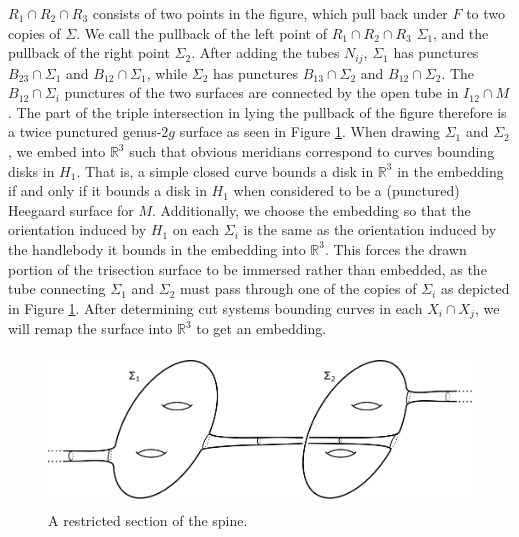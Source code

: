\documentclass[12pt]{amsart}
\newcommand{\R}{\mathbb{R}}
\theoremstyle{definition}
\theoremstyle{remark}
\begin{document}
$R_1 \cap R_2 \cap R_3$ consists of two points in the figure, which pull back under $F$ to two copies of $\Sigma$.  We call the pullback of the left point of $R_1 \cap R_2 \cap R_3$ $\Sigma_1$, and the pullback of the right point $\Sigma_2$.  After adding the tubes $N_{ij}$, $\Sigma_1$ has punctures $B_{23} \cap \Sigma_1$ and $B_{12} \cap \Sigma_1$, while $\Sigma_2$ has punctures $B_{13} \cap \Sigma_2$ and $B_{12} \cap \Sigma_2$.  The $B_{12} \cap \Sigma_i$ punctures of the two surfaces are connected by the open tube in $I_{12} \cap M$.   The part of the triple intersection in lying the pullback of the figure therefore is a twice punctured genus-$2g$ surface as seen in Figure \ref{fig_coresubsurface}.  When drawing $\Sigma_1$ and $\Sigma_2$, we embed into $\R^3$ such that obvious meridians correspond to curves bounding disks in $H_1$.  That is, a simple closed curve bounds a disk in $\R^3$ in the embedding if and only if it bounds a disk in $H_1$ when considered to be a (punctured) Heegaard surface for $M$.  Additionally, we choose the embedding so that the orientation induced by $H_1$ on each $\Sigma_i$ is the same as the orientation induced by the handlebody it bounds in the embedding into $\R^3$.  This forces the drawn portion of the trisection surface to be immersed rather than embedded, as the tube connecting $\Sigma_1$ and $\Sigma_2$ must pass through one of the copies of $\Sigma_i$ as depicted in Figure \ref{fig_coresubsurface}.  After determining cut systems bounding curves in each $X_i \cap X_j$, we will remap the surface into $\R^3$ to get an embedding.

\begin{figure}[h]
\centering
\includegraphics[height=1.6in]{coresubsurface.png}
\caption{A restricted section of the spine.}
\label{fig_coresubsurface}
\end{figure}
\end{document}
